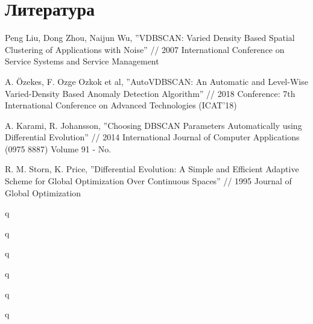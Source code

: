 \documentclass[12pt,fleqn]{article}
\begin{document}
\section{Литература}

\begin{thebibliography}{2}

Peng Liu, Dong Zhou, Naijun Wu,  ''VDBSCAN: Varied Density Based Spatial Clustering of Applications with Noise'' // 2007 International Conference on Service Systems and Service Management

A. Özekes, F. Ozge Ozkok et al, ''AutoVDBSCAN: An Automatic and Level-Wise Varied-Density Based Anomaly Detection Algorithm'' //  2018
Conference: 7th International Conference on Advanced Technologies (ICAT'18)


A. Karami, R. Johansson, ''Choosing DBSCAN Parameters Automatically using
Differential Evolution'' // 2014 International Journal of Computer Applications (0975 8887) Volume 91 - No.

R. M. Storn, K. Price, ''Differential Evolution: A Simple and Efficient Adaptive Scheme for Global Optimization Over Continuous Spaces'' // 1995 Journal of Global Optimization

q

q

q

q

q

q

\end{thebibliography}
\end{document}

